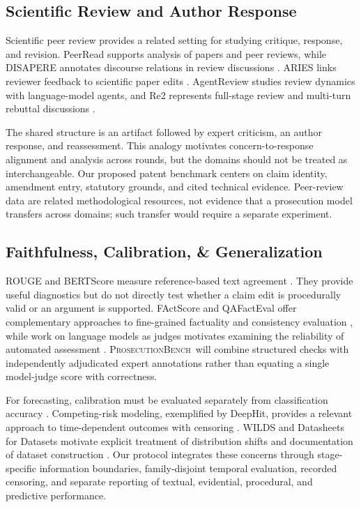 \documentclass[11pt]{article}
\newcommand{\bench}{\textsc{ProsecutionBench}}
\begin{document}
\subsection{Scientific Review and Author Response}
\label{sec:rw-peer-review}

Scientific peer review provides a related setting for studying critique, response, and revision. PeerRead supports analysis of papers and peer reviews, while DISAPERE annotates discourse relations in review discussions \citep{kang2018peerread,kennard2022disapere}. ARIES links reviewer feedback to scientific paper edits \citep{darcy2024aries}. AgentReview studies review dynamics with language-model agents, and Re2 represents full-stage review and multi-turn rebuttal discussions \citep{jin2024agentreview,zhang2025re2}.

The shared structure is an artifact followed by expert criticism, an author response, and reassessment. This analogy motivates concern-to-response alignment and analysis across rounds, but the domains should not be treated as interchangeable. Our proposed patent benchmark centers on claim identity, amendment entry, statutory grounds, and cited technical evidence. Peer-review data are related methodological resources, not evidence that a prosecution model transfers across domains; such transfer would require a separate experiment.

\subsection{Faithfulness, Calibration, \& Generalization}
\label{sec:rw-evaluation}

ROUGE and BERTScore measure reference-based text agreement \citep{lin2004rouge,zhang2019bertscore}. They provide useful diagnostics but do not directly test whether a claim edit is procedurally valid or an argument is supported. FActScore and QAFactEval offer complementary approaches to fine-grained factuality and consistency evaluation \citep{min2023factscore,fabbri2022qafacteval}, while work on language models as judges motivates examining the reliability of automated assessment \citep{zheng2023judge}. \bench\ will combine structured checks with independently adjudicated expert annotations rather than equating a single model-judge score with correctness.

For forecasting, calibration must be evaluated separately from classification accuracy \citep{guo2017calibration}. Competing-risk modeling, exemplified by DeepHit, provides a relevant approach to time-dependent outcomes with censoring \citep{lee2018deephit}. WILDS and Datasheets for Datasets motivate explicit treatment of distribution shifts and documentation of dataset construction \citep{koh2021wilds,gebru2021datasheets}. Our protocol integrates these concerns through stage-specific information boundaries, family-disjoint temporal evaluation, recorded censoring, and separate reporting of textual, evidential, procedural, and predictive performance.
\end{document}
